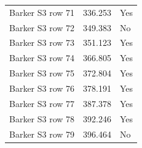{\begin{longtable}{lrl}
Barker S3 row 71 & 336.253 & Yes \\
Barker S3 row 72 & 349.383 & No \\
Barker S3 row 73 & 351.123 & Yes \\
Barker S3 row 74 & 366.805 & Yes \\
Barker S3 row 75 & 372.804 & Yes \\
Barker S3 row 76 & 378.191 & Yes \\
Barker S3 row 77 & 387.378 & Yes \\
Barker S3 row 78 & 392.246 & Yes \\
Barker S3 row 79 & 396.464 & No \\
\end{longtable}
}
